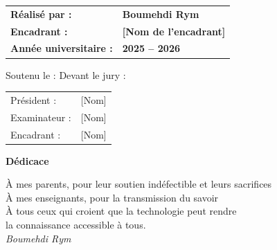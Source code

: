 \documentclass[12pt, a4paper, twoside, openany]{report}
\begin{document}
\begin{titlepage}
  \vspace{0.8cm}
  \begin{center}
    \begin{tabular}{ll}
      \textbf{\color{DSdark}R\'ealis\'e par :}        & \textbf{Boumehdi Rym} \\[4pt]
      \textbf{\color{DSdark}Encadrant :}               & \textbf{[Nom de l'encadrant]} \\[4pt]
      \textbf{\color{DSdark}Ann\'ee universitaire :}   & \textbf{2025 -- 2026} \\
    \end{tabular}
  \end{center}

  \vfill
  \begin{center}
    {\color{white}\normalsize Soutenu le : \underline{\hspace{4cm}}
     \hspace{2cm} Devant le jury :}\\[6pt]
    {\color{white}\small
      \begin{tabular}{ll}
        Pr\'esident :   & [Nom] \\
        Examinateur :   & [Nom] \\
        Encadrant :     & [Nom] \\
      \end{tabular}
    }
  \end{center}
  \vspace{0.3cm}
\end{titlepage}

\clearpage
\thispagestyle{empty}
\vspace*{6cm}
\begin{flushright}
  \begin{minipage}{0.6\textwidth}
    \itshape\large\color{DSdark}
    \begin{center}\textbf{D\'edicace}\end{center}
    \vspace{0.5cm}
    \`A mes parents, pour leur soutien ind\'efectible et leurs sacrifices\\[8pt]
    \`A mes enseignants, pour la transmission du savoir\\[8pt]
    \`A tous ceux qui croient que la technologie peut rendre\\
    la connaissance accessible \`a tous.
    \vspace{0.5cm}\\
    \hfill\textit{Boumehdi Rym}
  \end{minipage}
\end{flushright}
\end{document}

